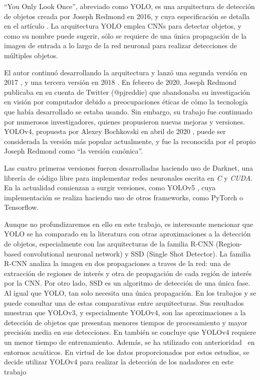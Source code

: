 ``You Only Look Once'', abreviado como YOLO, es una arquitectura de detección de objetos creada por Joseph Redmond en 2016, y cuya especificación se detalla en el artículo \cite{yolooriginalpaper}. La arquitectura YOLO emplea CNNs para detectar objetos, y como su nombre puede sugerir, sólo se requiere de una única propagación de la imagen de entrada a lo largo de la red neuronal para realizar detecciones de múltiples objetos.

El autor continuó desarrollando la arquitectura y lanzó una segunda versión en 2017 \cite{yolov2originalpaper}, y una tercera versión en 2018 \cite{yolov3originalpaper}. En febrero de 2020, Joseph Redmond publicaba en su cuenta de Twitter (@pjreddie) que abandonaba su investigación en visión por computador debido a preocupaciones éticas de cómo la tecnología que había desarrollado se estaba usando. Sin embargo, su trabajo fue continuado por numerosos investigadores, quienes propusieron nuevas mejoras y versiones. YOLOv4, propuesta por Alexey Bochkovski en abril de 2020 \cite{yolov4originalpaper}, puede ser considerada la versión más popular actualmente, y fue la reconocida por el propio Joseph Redmond como ``la versión canónica''. 

Las cuatro primeras versiones fueron desarrolladas haciendo uso de Darknet, una librería de código libre para implementar redes neuronales escrita en \textit{C} y \textit{CUDA}. En la actualidad comienzan a surgir versiones, como YOLOv5 \cite{yolov5pseudopaper}, cuya implementación se realiza haciendo uso de otros frameworks, como PyTorch o Tensorflow.

Aunque no profundizaremos en ello en este trabajo, es interesante mencionar que YOLO se ha comparado en la literatura con otras aproximaciones a la detección de objetos, especialmente con las arquitecturas de la familia R-CNN (Region-based convolutional neuronal network) y SSD (Single Shot Detector). La familia R-CNN analiza la imagen en dos propagaciones a traves de la red: una de extracción de regiones de interés y otra de propagación de cada región de interés por la CNN. Por otro lado, SSD es un algoritmo de detección de una única fase. Al igual que YOLO, tan solo necesita una única propagación. 
En los trabajos \cite{comparisoncnnscoches} y \cite{comparativaseniales} se puede consultar una de estas comparativas entre arquitecturas. Sus resultados muestran que YOLOv3, y especialmente YOLOv4, son las aproximaciones a la detección de objetos que presentan menores tiempos de procesamiento y mayor precisión media en sus detecciones. En \cite{comparativaseniales} también se concluye que YOLOv4 requiere un menor tiempo de entrenamiento. Además, se ha utilizado con anterioridad~\cite{rcnnvsyolodivers} en entornos acuáticos. En virtud de los datos proporcionados por estos estudios, se decide utilizar YOLOv4 para realizar la detección de los nadadores en este trabajo

